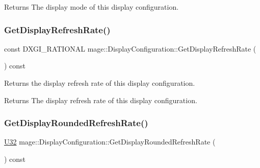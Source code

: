 \begin{DoxyReturn}{Returns}
The display mode of this display configuration. 
\end{DoxyReturn}
\hypertarget{structmage_1_1_display_configuration_aa92237613f8077d189f9504fec371cb8}{}\label{structmage_1_1_display_configuration_aa92237613f8077d189f9504fec371cb8} 
\subsubsection{\texorpdfstring{Get\+Display\+Refresh\+Rate()}{GetDisplayRefreshRate()}}
{\footnotesize\ttfamily const D\+X\+G\+I\+\_\+\+R\+A\+T\+I\+O\+N\+AL mage\+::\+Display\+Configuration\+::\+Get\+Display\+Refresh\+Rate (\begin{DoxyParamCaption}{ }\end{DoxyParamCaption}) const\hspace{0.3cm}{\ttfamily [noexcept]}}

Returns the display refresh rate of this display configuration.

\begin{DoxyReturn}{Returns}
The display refresh rate of this display configuration. 
\end{DoxyReturn}
\hypertarget{structmage_1_1_display_configuration_aada8415f1dbebb7f24decc2d5bf030ab}{}\label{structmage_1_1_display_configuration_aada8415f1dbebb7f24decc2d5bf030ab} 
\subsubsection{\texorpdfstring{Get\+Display\+Rounded\+Refresh\+Rate()}{GetDisplayRoundedRefreshRate()}}
{\footnotesize\ttfamily \hyperlink{namespacemage_a41c104c036fba3756a74e19f793eeaa1}{U32} mage\+::\+Display\+Configuration\+::\+Get\+Display\+Rounded\+Refresh\+Rate (\begin{DoxyParamCaption}{ }\end{DoxyParamCaption}) const\hspace{0.3cm}{\ttfamily [noexcept]}}

